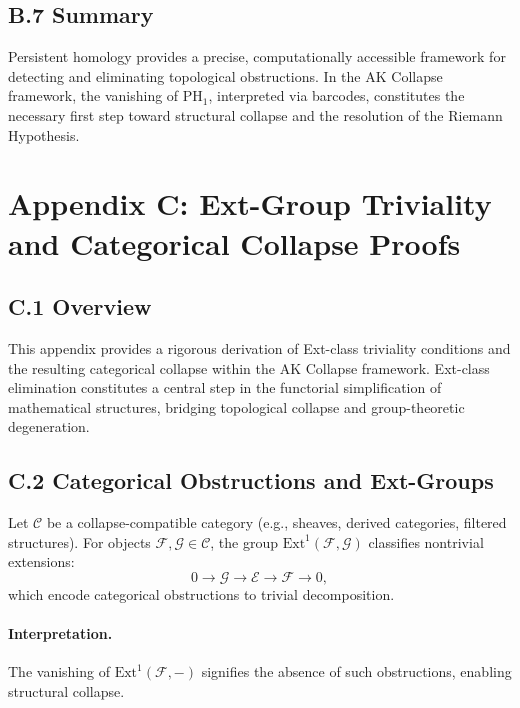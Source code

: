 \documentclass[11pt]{article}
\begin{document}
\subsection*{B.7 Summary}

Persistent homology provides a precise, computationally accessible framework for detecting and eliminating topological obstructions. In the AK Collapse framework, the vanishing of $\mathrm{PH}_1$, interpreted via barcodes, constitutes the necessary first step toward structural collapse and the resolution of the Riemann Hypothesis.



\section*{Appendix C: Ext-Group Triviality and Categorical Collapse Proofs}

\subsection*{C.1 Overview}

This appendix provides a rigorous derivation of Ext-class triviality conditions and the resulting categorical collapse within the AK Collapse framework. Ext-class elimination constitutes a central step in the functorial simplification of mathematical structures, bridging topological collapse and group-theoretic degeneration.

\subsection*{C.2 Categorical Obstructions and Ext-Groups}

Let $\mathcal{C}$ be a collapse-compatible category (e.g., sheaves, derived categories, filtered structures). For objects $\mathcal{F}, \mathcal{G} \in \mathcal{C}$, the group $\mathrm{Ext}^1(\mathcal{F}, \mathcal{G})$ classifies nontrivial extensions:
\[
0 \longrightarrow \mathcal{G} \longrightarrow \mathcal{E} \longrightarrow \mathcal{F} \longrightarrow 0,
\]
which encode categorical obstructions to trivial decomposition.

\paragraph{Interpretation.}  
The vanishing of $\mathrm{Ext}^1(\mathcal{F}, -)$ signifies the absence of such obstructions, enabling structural collapse.
\end{document}
